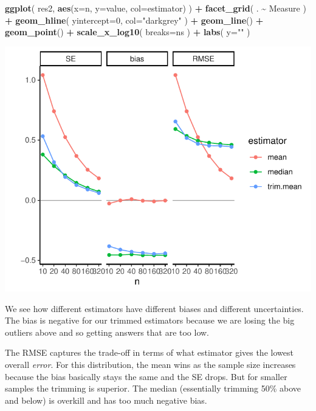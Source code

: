 \documentclass[
]{book}
\newenvironment{Shaded}{\begin{snugshade}}{\end{snugshade}}
\newcommand{\AttributeTok}[1]{\textcolor[rgb]{0.13,0.29,0.53}{#1}}
\newcommand{\DecValTok}[1]{\textcolor[rgb]{0.00,0.00,0.81}{#1}}
\newcommand{\FunctionTok}[1]{\textcolor[rgb]{0.13,0.29,0.53}{\textbf{#1}}}
\newcommand{\NormalTok}[1]{#1}
\newcommand{\SpecialCharTok}[1]{\textcolor[rgb]{0.81,0.36,0.00}{\textbf{#1}}}
\newcommand{\StringTok}[1]{\textcolor[rgb]{0.31,0.60,0.02}{#1}}
\begin{document}
\begin{Shaded}
\begin{Highlighting}[]
\FunctionTok{ggplot}\NormalTok{( res2, }\FunctionTok{aes}\NormalTok{(}\AttributeTok{x=}\NormalTok{n, }\AttributeTok{y=}\NormalTok{value, }\AttributeTok{col=}\NormalTok{estimator) ) }\SpecialCharTok{+}
    \FunctionTok{facet\_grid}\NormalTok{( . }\SpecialCharTok{\textasciitilde{}}\NormalTok{ Measure ) }\SpecialCharTok{+}
    \FunctionTok{geom\_hline}\NormalTok{( }\AttributeTok{yintercept=}\DecValTok{0}\NormalTok{, }\AttributeTok{col=}\StringTok{"darkgrey"}\NormalTok{ ) }\SpecialCharTok{+}
    \FunctionTok{geom\_line}\NormalTok{() }\SpecialCharTok{+} \FunctionTok{geom\_point}\NormalTok{() }\SpecialCharTok{+}
    \FunctionTok{scale\_x\_log10}\NormalTok{( }\AttributeTok{breaks=}\NormalTok{ns ) }\SpecialCharTok{+}
    \FunctionTok{labs}\NormalTok{( }\AttributeTok{y=}\StringTok{""}\NormalTok{ )}
\end{Highlighting}
\end{Shaded}

\begin{center}\includegraphics[width=0.75\linewidth]{Designing-Simulations-in-R_files/figure-latex/unnamed-chunk-192-1} \end{center}

We see how different estimators have different biases and different
uncertainties. The bias is negative for our trimmed estimators because we
are losing the big outliers above and so getting answers that are too low.

The RMSE captures the trade-off in terms of what estimator gives the lowest
overall \emph{error}. For this distribution, the mean wins as the sample size
increases because the bias basically stays the same and the SE drops. But
for smaller samples the trimming is superior. The median (essentially
trimming 50\% above and below) is overkill and has too much negative bias.
\end{document}
